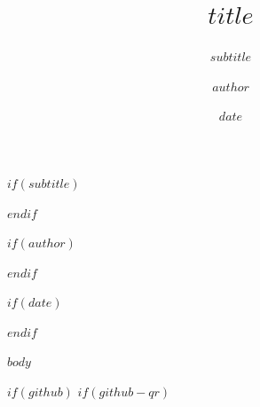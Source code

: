 \documentclass[aspectratio=169]{beamer}
\title{$title$}
\subtitle{$subtitle$}
\author{$author$}
\date{$date$}
\date{}
\begin{document}
\providecommand{\tightlist}{%
  \setlength{\itemsep}{0pt}\setlength{\parskip}{0pt}}

\providecommand{\citeproctext}{}
\providecommand{\citeproc}[2]{\hyperlink{#1}{#2}}

\newenvironment{CSLReferences}[2]
  {\begin{list}{}{\setlength{\leftmargin}{0pt}
   \setlength{\itemindent}{0pt}
   \setlength{\itemsep}{\parskip}
   \setlength{\parsep}{0pt}}}
  {\end{list}}

\newcommand{\CSLLeftMargin}[1]{\hspace*{#1}}
\newcommand{\CSLRightInline}[1]{#1}
\newcommand{\CSLIndent}[1]{\hspace*{#1}}

\begin{frame}[plain]
  \begin{center}

    \vspace{1.5cm}

    {
    \MakeUppercase{\inserttitle}\par}

    $if(subtitle)$
    \vspace{0.5em}

    {
    \titlecap{\insertsubtitle}\par}
    $endif$

    \vspace{1em}

    $if(author)$
    \vspace{0.5em}

    {
    \insertauthor\par}
    $endif$

    \vspace{1em}

    $if(date)$
    \vspace{0.5em}

    {
     \insertdate\par}
    $endif$

  \end{center}
\end{frame}

$body$

$if(github)$
$if(github-qr)$
\end{document}
